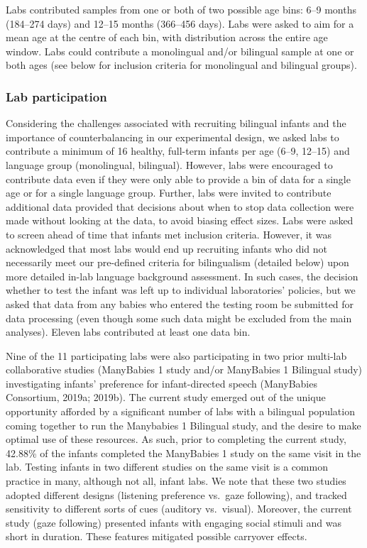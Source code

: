 \documentclass[,man,floatsintext]{apa6}
\begin{document}
Labs contributed samples from one or both of two possible age bins: 6--9 months (184--274 days) and 12--15 months (366--456 days). Labs were asked to aim for a mean age at the centre of each bin, with distribution across the entire age window. Labs could contribute a monolingual and/or bilingual sample at one or both ages (see below for inclusion criteria for monolingual and bilingual groups).

\hypertarget{lab-participation}{%
\subsubsection{Lab participation}\label{lab-participation}}

Considering the challenges associated with recruiting bilingual infants and the importance of counterbalancing in our experimental design, we asked labs to contribute a minimum of 16 healthy, full-term infants per age (6--9, 12--15) and language group (monolingual, bilingual). However, labs were encouraged to contribute data even if they were only able to provide a bin of data for a single age or for a single language group. Further, labs were invited to contribute additional data provided that decisions about when to stop data collection were made without looking at the data, to avoid biasing effect sizes. Labs were asked to screen ahead of time that infants met inclusion criteria. However, it was acknowledged that most labs would end up recruiting infants who did not necessarily meet our pre-defined criteria for bilingualism (detailed below) upon more detailed in-lab language background assessment. In such cases, the decision whether to test the infant was left up to individual laboratories' policies, but we asked that data from any babies who entered the testing room be submitted for data processing (even though some such data might be excluded from the main analyses). Eleven labs contributed at least one data bin.

Nine of the 11 participating labs were also participating in two prior multi-lab collaborative studies (ManyBabies 1 study and/or ManyBabies 1 Bilingual study) investigating infants' preference for infant-directed speech (ManyBabies Consortium, 2019a; 2019b). The current study emerged out of the unique opportunity afforded by a significant number of labs with a bilingual population coming together to run the Manybabies 1 Bilingual study, and the desire to make optimal use of these resources. As such, prior to completing the current study, 42.88\% of the infants completed the ManyBabies 1 study on the same visit in the lab. Testing infants in two different studies on the same visit is a common practice in many, although not all, infant labs. We note that these two studies adopted different designs (listening preference vs.~gaze following), and tracked sensitivity to different sorts of cues (auditory vs.~visual). Moreover, the current study (gaze following) presented infants with engaging social stimuli and was short in duration. These features mitigated possible carryover effects.
\end{document}
